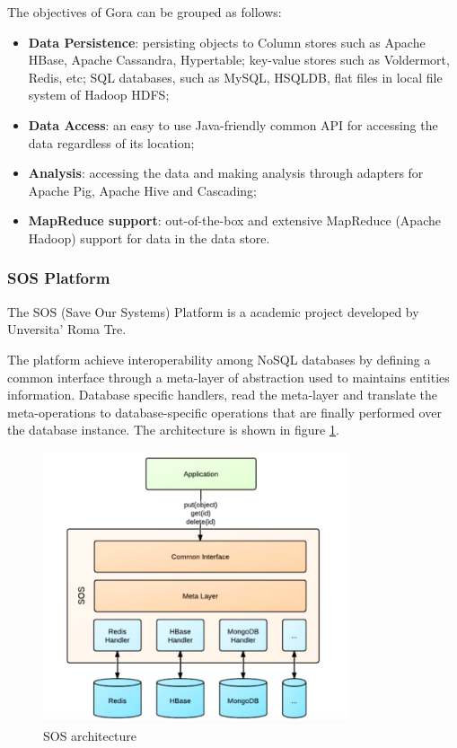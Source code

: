 \newparagraph The objectives of Gora can be grouped as follows:
\begin{itemize}
\item \textbf{Data Persistence}: persisting objects to Column stores such as Apache HBase, Apache Cassandra, Hypertable; key-value stores such as Voldermort, Redis, etc; SQL databases, such as MySQL, HSQLDB, flat files in local file system of Hadoop HDFS; 
\item \textbf{Data Access}: an easy to use Java-friendly common API for accessing the data regardless of its location; 
\item \textbf{Analysis}: accessing the data and making analysis through adapters for Apache Pig, Apache Hive and Cascading;
\item \textbf{MapReduce support}: out-of-the-box and extensive MapReduce (Apache Hadoop) support for data in the data store.
\end{itemize}

\subsubsection{SOS Platform}
The SOS (Save Our Systems) Platform \cite{paper:sos-platform} is a academic project developed by Unversita' Roma Tre.

\noindent The platform achieve interoperability among NoSQL databases by defining a common interface through a meta-layer of abstraction used to maintains entities information. Database specific handlers, read the meta-layer and translate the meta-operations to database-specific operations that are finally performed over the database instance.
The architecture is shown in figure \ref{fig:sos-architecture}.

\begin{figure}[tbh]
  \centering
  \includegraphics[width=9cm]{images/sos_architecture}
  \caption{SOS architecture \cite{paper:sos-platform}}
  \label{fig:sos-architecture}
\end{figure}


